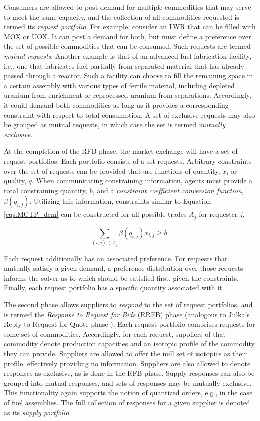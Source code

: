 Consumers are allowed to post demand for multiple commodities that may serve to
meet the same capacity, and the collection of all commodities requested is
termed its \textit{request portfolio}. For example, consider an LWR that can be
filled with MOX or UOX. It can post a demand for both, but must define a
preference over the set of possible commodities that can be consumed. Such
requests are termed \textit{mutual requests}. Another example is that of an
advanced fuel fabrication facility, i.e., one that fabricates fuel partially
from separated material that has already passed through a reactor. Such a
facility can choose to fill the remaining space in a certain assembly with
various types of fertile material, including depleted uranium from enrichment or
reprocessed uranium from separations. Accordingly, it could demand both
commodities as long as it provides a corresponding constraint with respect to
total consumption. A set of exclusive requests may also be grouped as mutual
requests, in which case the set is termed \textit{mutually exclusive}.

At the completion of the RFB phase, the market exchange will have a set of
request portfolios. Each portfolio consists of a set requests. Arbitrary
constraints over the set of requests can be provided that are functions of
quantity, $x$, or quality, $q$.  When communicating constraining information,
agents must provide a total constraining quantity, $b$, and a \textit{constraint
  coefficient conversion function}, $\beta (q_{i, j})$. Utilizing this
information, constraints similar to Equation \ref{eqs:MCTP_dem} can be
constructed for all possible trades $A_j$ for requester $j$,

\begin{equation}\label{meth:constr}
  \sum_{(i, j) \in A_j} \beta (q_{i,j}) x_{i, j} \geq b.
\end{equation}

\noindent
Each request additionally has an associated preference. For requests that
mutually satisfy a given demand, a preference distribution over those requests
informs the solver as to which should be satisfied first, given the
constraints. Finally, each request portfolio has a specific quantity associated
with it.

The second phase allows suppliers to \textit{respond} to the set of request
portfolios, and is termed the \textit{Response to Request for Bids} (RRFB) phase
(analogous to Julka's Reply to Request for Quote phase
\cite{julka_agent-based_2002}). Each request portfolio comprises requests
for some set of commodities. Accordingly, for each request, suppliers of that
commodity denote production capacities and an isotopic profile of the commodity
they can provide. Suppliers are allowed to offer the null set of isotopics as
their profile, effectively providing no information. Suppliers are also allowed
to denote responses as exclusive, as is done in the RFB phase. Supply responses
can also be grouped into mutual responses, and sets of responses may be mutually
exclusive. This functionality again supports the notion of quantized orders,
e.g., in the case of fuel assemblies. The full collection of responses for a
given supplier is denoted as its \textit{supply portfolio}.

